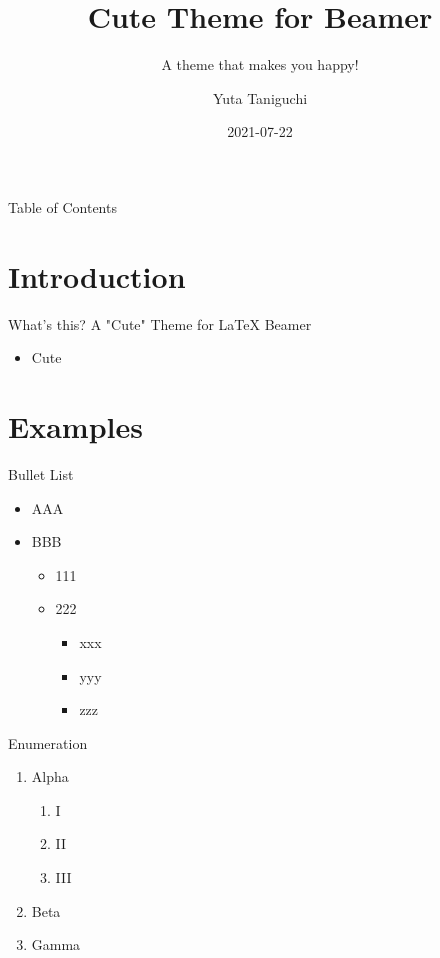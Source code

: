 \documentclass[12pt,t]{beamer}
\title[Cute Theme]{Cute Theme for Beamer}
\subtitle{A theme that makes you happy!}
\author[Y.~Taniguchi]{Yuta Taniguchi}
\institute{@yuttieyuttie}
\date{2021-07-22}
\begin{document}
{
  \frame{\titlepage}
}
\setcounter{framenumber}{0}


\begin{frame}{Table of Contents}
  \centering
  \toc
\end{frame}


\section{Introduction}
\begin{frame}{What's this?}
  \alert{A "Cute" Theme for LaTeX Beamer}
  \begin{itemize}
    \item Cute
  \end{itemize}
\end{frame}


\section{Examples}
\begin{frame}{Bullet List}
  \begin{itemize}
  \item AAA
  \item BBB
    \begin{itemize}
    \item 111
    \item 222
      \begin{itemize}
      \item xxx
      \item yyy
      \item zzz
      \end{itemize}
    \end{itemize}
  \end{itemize}
\end{frame}


\begin{frame}{Enumeration}
  \begin{enumerate}
  \item Alpha
    \begin{enumerate}
    \item I
    \item II
    \item III
    \end{enumerate}
  \item Beta
  \item Gamma
  \end{enumerate}
\end{frame}
\end{document}
